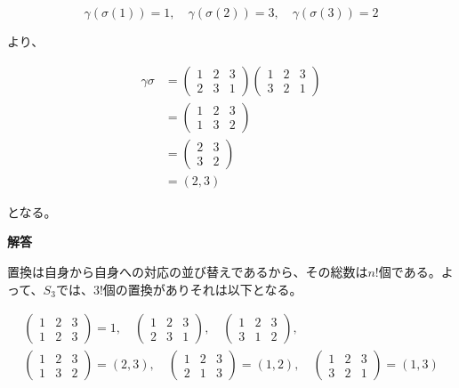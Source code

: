 \documentclass[dvipdfmx,autodetect-engine]{jsarticle}
\theoremstyle{definition}
\begin{document}
$$
\gamma(\sigma(1)) = 1, \quad \gamma(\sigma(2)) = 3, \quad \gamma(\sigma(3)) = 2
$$

より、

\begin{equation*}
\begin{split}
\gamma\sigma &= \begin{pmatrix}
1 & 2 & 3 \\
2 & 3 & 1
\end{pmatrix} \begin{pmatrix}
1 & 2 & 3 \\
3 & 2 & 1
\end{pmatrix}\\[1ex]
&= \begin{pmatrix}
1 & 2 & 3 \\
1 & 3 & 2
\end{pmatrix}\\[1ex]
&= \begin{pmatrix}
2 & 3 \\
3 & 2
\end{pmatrix}\\[1ex]
&= (2, 3)
\end{split}
\end{equation*}

となる。

\label{exercise:permutation1}

{\bf 解答}

置換は自身から自身への対応の並び替えであるから、その総数は$n!$個である。よって、$S_3$では、$3!$個の置換がありそれは以下となる。

\begin{eqnarray*}
\begin{pmatrix}
1 & 2 & 3 \\
1 & 2 & 3
\end{pmatrix} = 1, \quad \begin{pmatrix}
1 & 2 & 3 \\
2 & 3 & 1
\end{pmatrix}, \quad \begin{pmatrix}
1 & 2 & 3 \\
3 & 1 & 2
\end{pmatrix}, \\[1.5ex]
\begin{pmatrix}
1 & 2 & 3 \\
1 & 3 & 2
\end{pmatrix} = (2, 3), \quad 
\begin{pmatrix}
1 & 2 & 3 \\
2 & 1 & 3
\end{pmatrix} = (1, 2), \quad 
\begin{pmatrix}
1 & 2 & 3 \\
3 & 2 & 1
\end{pmatrix} = (1, 3)
\end{eqnarray*}
\end{document}
